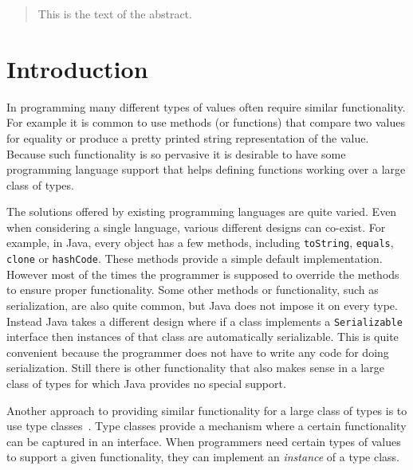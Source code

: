 \documentclass[preprint]{sigplanconf}
\begin{document}
\maketitle

\begin{abstract}
This is the text of the abstract.
\end{abstract}




\section{Introduction}

In programming many different types of values often require similar
functionality. For example it is common to use methods (or
functions) that compare two values for equality or produce a pretty
printed string representation of the value. Because such functionality
is so pervasive it is desirable to have some programming language support
that helps defining functions working over a large class of types.

The solutions offered by existing programming languages are quite
varied. Even when considering a single language, various different
designs can co-exist.  For example, in Java, every object has a few
methods, including \lstinline{toString}, \lstinline{equals},
\lstinline{clone} or \lstinline{hashCode}.  These methods provide a
simple default implementation. However most of the times the
programmer is supposed to override the methods to ensure proper
functionality. Some other methods or functionality, such as
serialization, are also quite common, but Java does not impose it on
every type. Instead Java takes a different design where if a class
implements a \lstinline{Serializable} interface then instances of
that class are automatically serializable. This is
quite convenient because the programmer does not have to write any
code for doing serialization. Still there is other functionality
that also makes sense in a large class of types for which Java
provides no special support.

Another approach to providing similar functionality for a large class
of types is to use type classes~\cite{}. Type classes provide a
mechanism where a certain functionality can be captured in an
interface. When programmers need certain types of values to support a
given functionality, they can implement an \emph{instance} of a type
class.
\end{document}
